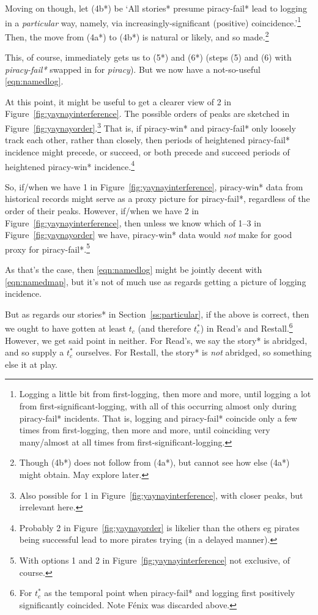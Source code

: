 \documentclass{amsart}
\newcommand{\ment}[1]{\textit{#1}} %
\theoremstyle{definition}
\theoremstyle{remark}
\begin{document}
		Moving on though, let (4b*) be `All stories* presume piracy-fail* lead to logging in a \emph{particular} way, namely, via increasingly-significant (positive) coincidence.'\footnote{Logging a little bit from first-logging, then more and more, until logging a lot from first-significant-logging, with all of this occurring almost only during piracy-fail* incidents. That is, logging and piracy-fail* coincide only a few times from first-logging, then more and more, until coinciding very many/almost at all times from first-significant-logging.} Then, the move from (4a*) to (4b*) is natural or likely, and so made.\footnote{Though (4b*) does not follow from (4a*), but cannot see how else (4a*) might obtain. May explore later.}
		
		This, of course, immediately gets us to (5*) and (6*) (steps (5) and (6) with \ment{piracy-fail*} swapped in for \ment{piracy}). But we now have a not-so-useful \ref{eqn:namedlog}.
		
		At this point, it might be useful to get a clearer view of 2 in Figure~\ref{fig:yaynayinterference}. The possible orders of peaks are sketched in Figure~\ref{fig:yaynayorder}.\footnote{Also possible for 1 in Figure~\ref{fig:yaynayinterference}, with closer peaks, but irrelevant here.} That is, if piracy-win* and piracy-fail* only loosely track each other, rather than closely, then periods of heightened piracy-fail* incidence might precede, or succeed, or both precede and succeed periods of heightened piracy-win* incidence.\footnote{Probably 2 in Figure~\ref{fig:yaynayorder} is likelier than the others eg pirates being successful lead to more pirates trying (in a delayed manner).}
		
		So, if/when we have 1 in Figure~\ref{fig:yaynayinterference}, piracy-win* data from historical records might serve as a proxy picture for piracy-fail*, regardless of the order of their peaks. However, if/when we have 2 in Figure~\ref{fig:yaynayinterference}, then unless we know which of 1--3 in Figure~\ref{fig:yaynayorder} we have, piracy-win* data would \emph{not} make for good proxy for piracy-fail*.\footnote{With options 1 and 2 in Figure~\ref{fig:yaynayinterference} not exclusive, of course.}
		
		As that's the case, then \ref{eqn:namedlog} might be jointly decent with \ref{eqn:namedmap}, but it's not of much use as regards getting a picture of logging incidence.
		
		But as regards our stories* in Section~\ref{ss:particular}, if the above is correct, then we ought to have gotten at least \(t_c\) (and therefore \(t_c^*\)) in Read's and Restall.\footnote{For \(t_c^*\) as the temporal point when piracy-fail* and logging first positively significantly coincided. Note Fénix was discarded above.} However, we get said point in neither. For Read's, we say the story* is abridged, and so supply a \(t_c^*\) ourselves. For Restall, the story* is \emph{not} abridged, so something else it at play.
		
\end{document}
